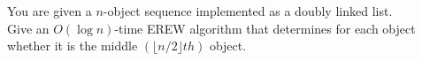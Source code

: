 You are given a $n$-object sequence implemented as a doubly linked list. \\

Give an $O(\log  n)$-time EREW algorithm that determines for each
object whether it is the middle $(\lfloor  n/2 \rfloor  th)$ object.
